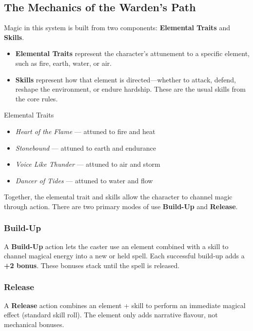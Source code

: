 \subsection{The Mechanics of the Warden’s Path}

Magic in this system is built from two components: \textbf{Elemental Traits} and \textbf{Skills}.

\begin{itemize}
    \item \textbf{Elemental Traits} represent the character’s attunement to a specific element, such as fire, earth, water, or air.
    \item \textbf{Skills} represent how that element is directed—whether to attack, defend, reshape the environment, or endure hardship. These are the usual skills from the core rules.
\end{itemize}

\begin{Example}{Elemental Traits}
    \begin{itemize}
        \item \textit{Heart of the Flame} — attuned to fire and heat  
        \item \textit{Stonebound} — attuned to earth and endurance  
        \item \textit{Voice Like Thunder} — attuned to air and storm  
        \item \textit{Dancer of Tides} — attuned to water and flow  
    \end{itemize}
\end{Example}

Together, the elemental trait and skills allow the character to channel magic through action. There are two primary modes of use \textbf{Build-Up} and \textbf{Release}.

\subsubsection{Build-Up}
A \textbf{Build-Up} action lets the caster use an element combined with a skill to channel magical energy into a new or held spell. Each successful build-up adds a \textbf{+2 bonus}. These bonuses stack until the spell is released.


\subsubsection{Release}
A \textbf{Release} action combines an element + skill to perform an immediate magical effect (standard skill roll). The element only adds narrative flavour, not mechanical bonuses.


